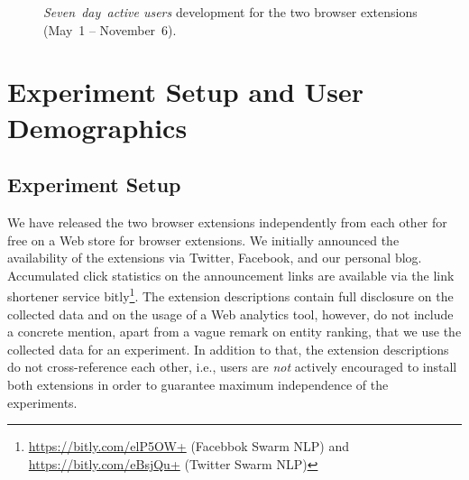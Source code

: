 \documentclass{iosart2c}
\begin{document}
\begin{figure}
  \centering
    \qquad
\caption{\textit{Seven~day~active users} development for the two browser extensions (May~1 -- November~6).}
\label{fig:swarmnlpstats}
\end{figure}

\section{Experiment Setup and User Demographics} \label{sec:userdemographics}
\subsection{Experiment Setup}
We have released the two browser extensions independently from each other for free on a Web store for browser extensions. 
We initially announced the availability of the extensions via Twitter, Facebook, and our personal blog.
Accumulated click statistics on the announcement links are available via the link shortener service bitly\footnote{\url{https://bitly.com/elP5OW+} (Facebbok Swarm NLP) and \url{https://bitly.com/eBsjQu+} (Twitter Swarm NLP)}.
The extension descriptions contain full disclosure on the collected data and on the usage of a Web analytics tool, however, do not include a concrete mention, apart from a vague remark on entity ranking, that we use the collected data for an experiment.
In addition to that, the extension descriptions do not cross-reference each other, i.e., users are \emph{not} actively encouraged to install both extensions in order to guarantee maximum independence of the experiments.
\end{document}
